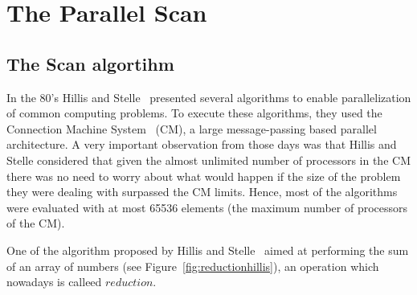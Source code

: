 \documentclass[Ingles]{ic-tese-v1}
\newcommand{\rfig}[1]{Figure~\ref{fig:#1}}
\begin{document}
\chapter{The Parallel Scan}
\label{cap:Scan}

\section{The Scan algortihm}
\label{sec:ScanAlg}

In the 80's Hillis and Stelle~\cite{dataparallel} presented several algorithms to enable parallelization of common computing problems. To execute these algorithms, they used the Connection Machine System~\cite{themachine} (CM), a large message-passing  based parallel architecture. A  very important observation from those days was that Hillis and Stelle considered that given the almost unlimited number of processors in the CM  there was no need to worry about what would happen if the size of the problem they were dealing with surpassed the CM limits. Hence, most of the algorithms were evaluated  with at most 65536 elements (the maximum number of processors of the CM).

One of the algorithm proposed by Hillis and Stelle~\cite{dataparallel} aimed at  performing the sum of an array of numbers (see \rfig{reductionhillis}), an operation which nowadays is calleed  $reduction$.
\end{document}
